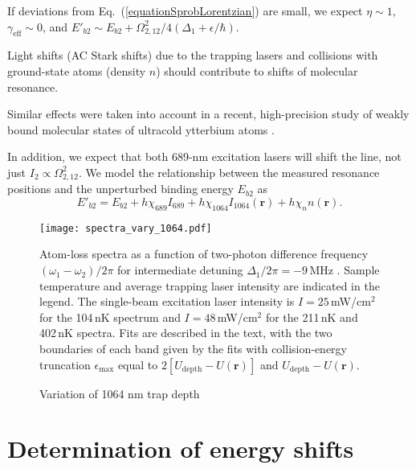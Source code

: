 If deviations from Eq.\ (\ref{equationSprobLorentzian}) are small, we expect $\eta\sim1$, $\gamma_{\text{eff}}\sim 0$, and $E'_{b2}\sim E_{b2}+{\Omega_{2,12}^{2}}/{4(\Delta_1+\epsilon/\hbar)}$.

Light shifts (AC Stark shifts) due to the trapping lasers and collisions with ground-state atoms (density $n$) should contribute to shifts of molecular resonance.

Similar effects were taken into account in a recent, high-precision study of weakly bound molecular states of ultracold ytterbium atoms \cite{bbc17}.

In addition, we expect that both 689-nm excitation lasers will shift the line, not just $I_2\propto \Omega_{2,12}^{2}$. We model the relationship between the measured resonance positions and the unperturbed binding energy $E_{b2}$ as
\begin{equation}\label{Eq:GlobalFit}
	E'_{b2}=E_{b2}+h\chi_{689}I_{689}+h\chi_{1064}I_{1064}(\mathbf{r})+h\chi_{n}n(\mathbf{r}).
\end{equation}


	\begin{figure} 
	\centerline{
	  \texttt{[image: spectra\_vary\_1064.pdf]}}
	  \caption{Variation of 1064 nm trap depth}{Atom-loss spectra as a function of two-photon difference frequency $(\omega_1-\omega_2)/2\pi$ for intermediate detuning
	$\Delta_1/2\pi=-9$\,MHz . Sample temperature and average trapping laser intensity are indicated in the legend. The single-beam excitation laser intensity is $I=25$\,mW/cm$^{2}$ for the 104\,nK spectrum and $I=48$\,mW/cm$^{2}$ for the 211\,nK and 402\,nK spectra. Fits are described in the text, with the two boundaries of each band given by the fits with collision-energy truncation
	$\epsilon_{\text{max}}$ equal to $2[U_{\text{depth}}-U(\mathbf{r})]$ and $U_{\text{depth}}-U(\mathbf{r})$.}
	
	\label{Fig:Spectraminus9MHzVaryTrapCold}
	\end{figure}












\section{Determination of energy shifts}
\label{sec:lowE_Eb2}



